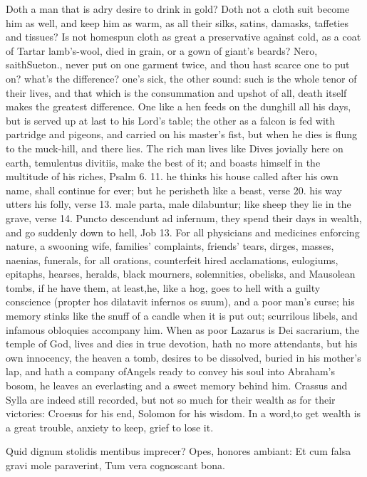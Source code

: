 {Doth a man that is adry desire to drink in gold? Doth not a cloth suit
become him as well, and keep him as warm, as all their silks, satins,
damasks, taffeties and tissues? Is not homespun cloth as great a
preservative against cold, as a coat of Tartar lamb's-wool, died in
grain, or a gown of giant's beards? Nero, saithSueton., never put
on one garment twice, and thou hast scarce one to put on? what's the
difference? one's sick, the other sound: such is the whole tenor of
their lives, and that which is the consummation and upshot of all,
death itself makes the greatest difference. One like a hen feeds on the
dunghill all his days, but is served up at last to his Lord's table;
the other as a falcon is fed with partridge and pigeons, and carried on
his master's fist, but when he dies is flung to the muck-hill, and
there lies. The rich man lives like Dives jovially here on earth,
temulentus divitiis, make the best of it; and boasts himself in the
multitude of his riches, Psalm  6. 11. he thinks his house called
after his own name, shall continue for ever; but he perisheth like a
beast, verse 20. his way utters his folly, verse 13. male parta, male
dilabuntur; like sheep they lie in the grave, verse 14. Puncto
descendunt ad infernum, they spend their days in wealth, and go
suddenly down to hell, Job  13. For all physicians and medicines
enforcing nature, a swooning wife, families' complaints, friends'
tears, dirges, masses, naenias, funerals, for all orations, counterfeit
hired acclamations, eulogiums, epitaphs, hearses, heralds, black
mourners, solemnities, obelisks, and Mausolean tombs, if he have them,
at least,he, like a hog, goes to hell with a guilty conscience
(propter hos dilatavit infernos os suum), and a poor man's curse; his
memory stinks like the snuff of a candle when it is put out; scurrilous
libels, and infamous obloquies accompany him. When as poor Lazarus is
Dei sacrarium, the temple of God, lives and dies in true devotion, hath
no more attendants, but his own innocency, the heaven a tomb, desires
to be dissolved, buried in his mother's lap, and hath a company
ofAngels ready to convey his soul into Abraham's bosom, he leaves
an everlasting and a sweet memory behind him. Crassus and Sylla are
indeed still recorded, but not so much for their wealth as for their
victories: Croesus for his end, Solomon for his wisdom. In a
word,to get wealth is a great trouble, anxiety to keep, grief to
lose it.

Quid dignum stolidis mentibus imprecer?
Opes, honores ambiant:
Et cum falsa gravi mole paraverint,
Tum vera cognoscant bona.

}
